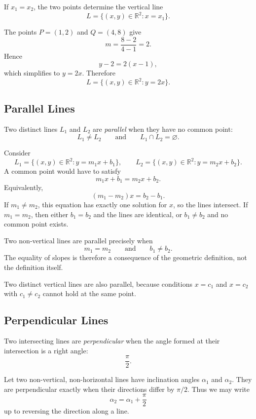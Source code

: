 If $x_1=x_2$, the two points determine the vertical line
\[
L=\{(x,y)\in\mathbb{R}^2:x=x_1\}.
\]

\begin{examplebox}
The points $P=(1,2)$ and $Q=(4,8)$ give
\[
m=\frac{8-2}{4-1}=2.
\]
Hence
\[
y-2=2(x-1),
\]
which simplifies to $y=2x$. Therefore
\[
L=\{(x,y)\in\mathbb{R}^2:y=2x\}.
\]
\end{examplebox}

\subsection{Parallel Lines}

\begin{definitionbox}
Two distinct lines $L_1$ and $L_2$ are \emph{parallel} when they have no common
point:
\[
\boxed{L_1\neq L_2
\qquad\text{and}\qquad
L_1\cap L_2=\varnothing.}
\]
\end{definitionbox}

Consider
\[
L_1=\{(x,y)\in\mathbb{R}^2:y=m_1x+b_1\},
\qquad
L_2=\{(x,y)\in\mathbb{R}^2:y=m_2x+b_2\}.
\]
A common point would have to satisfy
\[
m_1x+b_1=m_2x+b_2.
\]
Equivalently,
\[
(m_1-m_2)x=b_2-b_1.
\]
If $m_1\neq m_2$, this equation has exactly one solution for $x$, so the lines
intersect. If $m_1=m_2$, then either $b_1=b_2$ and the lines are identical, or
$b_1\neq b_2$ and no common point exists.

\begin{theorembox}
Two non-vertical lines are parallel precisely when
\[
\boxed{m_1=m_2
\qquad\text{and}\qquad
b_1\neq b_2.}
\]
The equality of slopes is therefore a consequence of the geometric definition,
not the definition itself.
\end{theorembox}

Two distinct vertical lines are also parallel, because conditions $x=c_1$ and
$x=c_2$ with $c_1\neq c_2$ cannot hold at the same point.

\subsection{Perpendicular Lines}

\begin{definitionbox}
Two intersecting lines are \emph{perpendicular} when the angle formed at their
intersection is a right angle:
\[
\boxed{\frac{\pi}{2}}.
\]
\end{definitionbox}

Let two non-vertical, non-horizontal lines have inclination angles $\alpha_1$
and $\alpha_2$. They are perpendicular exactly when their directions differ by
$\pi/2$. Thus we may write
\[
\alpha_2=\alpha_1+\frac{\pi}{2}
\]
up to reversing the direction along a line.

